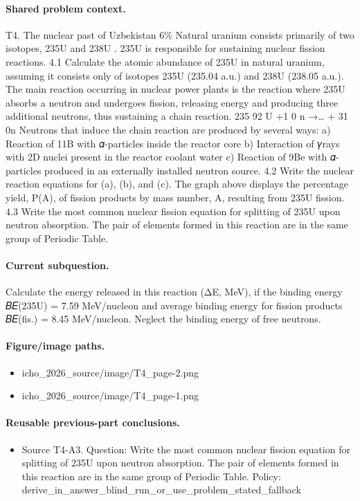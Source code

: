 \paragraph{Shared problem context.}
T4. The nuclear past of Uzbekistan 6\% Natural uranium consists primarily of two isotopes, 235U and 238U . 235U is responsible for sustaining nuclear fission reactions. 4.1 Calculate the atomic abundance of 235U in natural uranium, assuming it consists only of isotopes 235U (235.04 a.u.) and 238U (238.05 a.u.). The main reaction occurring in nuclear power plants is the reaction where 235U absorbs a neutron and undergoes fission, releasing energy and producing three additional neutrons, thus sustaining a chain reaction. 235 92 U +1 0 n →… + 31 0n Neutrons that induce the chain reaction are produced by several ways: a) Reaction of 11B with 𝛼-particles inside the reactor core b) Interaction of 𝛾rays with 2D nuclei present in the reactor coolant water c) Reaction of 9Be with 𝛼-particles produced in an externally installed neutron source. 4.2 Write the nuclear reaction equations for (a), (b), and (c). The graph above displays the percentage yield, P(A), of fission products by mass number, A, resulting from 235U fission. 4.3 Write the most common nuclear fission equation for splitting of 235U upon neutron absorption. The pair of elements formed in this reaction are in the same group of Periodic Table.

\paragraph{Current subquestion.}
Calculate the energy released in this reaction (ΔE, MeV), if the binding energy 𝐵𝐸(235U) = 7.59 MeV/nucleon and average binding energy for fission products 𝐵𝐸(fis.) = 8.45 MeV/nucleon. Neglect the binding energy of free neutrons.

\paragraph{Figure/image paths.}
\begin{itemize}
\item icho\_2026\_source/image/T4\_page-2.png
\item icho\_2026\_source/image/T4\_page-1.png
\end{itemize}

\paragraph{Reusable previous-part conclusions.}
\begin{itemize}
\item Source T4-A3. Question: Write the most common nuclear fission equation for splitting of 235U upon neutron absorption. The pair of elements formed in this reaction are in the same group of Periodic Table. Policy: derive\_in\_answer\_blind\_run\_or\_use\_problem\_stated\_fallback
\end{itemize}

